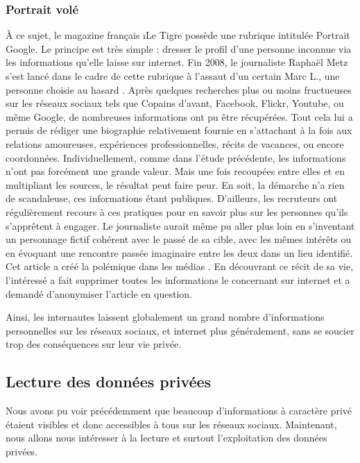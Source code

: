 \subsubsection{Portrait volé}
À ce sujet, le magazine français \i{Le Tigre} possède une rubrique intitulée Portrait Google. Le principe est très simple : dresser le profil d'une personne inconnue via les informations qu'elle laisse sur internet. Fin 2008, le journaliste Raphaël Metz s'est lancé dans le cadre de cette rubrique à l'assaut d'un certain Marc L., une personne choisie au hasard \cite{marcL}. Après quelques recherches plus ou moins fructueuses sur les réseaux sociaux tels que Copains d'avant, Facebook, Flickr, Youtube, ou même Google, de nombreuses informations ont pu être récupérées. Tout cela lui a permis de rédiger une biographie relativement fournie en s'attachant à la fois aux relations amoureuses, expériences professionnelles, récits de vacances, ou encore coordonnées. Individuellement, comme dans l'étude précédente, les informations n'ont pas forcément une grande valeur. Mais une fois recoupées entre elles et en multipliant les sources, le résultat peut faire peur. En soit, la démarche n'a rien de scandaleuse, ces informations étant publiques. D'ailleurs, les recruteurs ont régulièrement recours à ces pratiques pour en savoir plus sur les personnes qu'ils s'apprêtent à engager. Le journaliste aurait même pu aller plus loin en s'inventant un personnage fictif cohérent avec le passé de sa cible, avec les mêmes intérêts ou en évoquant une rencontre passée imaginaire entre les deux dans un lieu identifié.
Cet article a créé la polémique dans les médias \cite{marcLFigaro}. En découvrant ce récit de sa vie, l'intéressé a fait supprimer toutes les informations le concernant sur internet et a demandé d'anonymiser l'article en question.

Ainsi, les internautes laissent globalement un grand nombre d'informations personnelles sur les réseaux sociaux, et internet plus généralement, sans se soucier trop des conséquences sur leur vie privée.

\subsection{Lecture des données privées}
Nous avons pu voir précédemment que beaucoup d'informations à caractère privé étaient visibles et donc accessibles à tous sur les réseaux sociaux. Maintenant, nous allons nous intéresser à la lecture et surtout l'exploitation des données privées.

